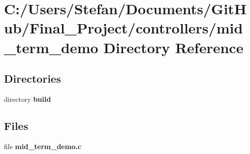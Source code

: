 \section{C\-:/\-Users/\-Stefan/\-Documents/\-Git\-Hub/\-Final\-\_\-\-Project/controllers/mid\-\_\-term\-\_\-demo Directory Reference}
\label{dir_5ee80205e089cc14cbbcf0181e41271f}
\subsection*{Directories}
\begin{DoxyCompactItemize}
\item 
directory {\bf build}
\end{DoxyCompactItemize}
\subsection*{Files}
\begin{DoxyCompactItemize}
\item 
file {\bf mid\-\_\-term\-\_\-demo.\-c}
\end{DoxyCompactItemize}
